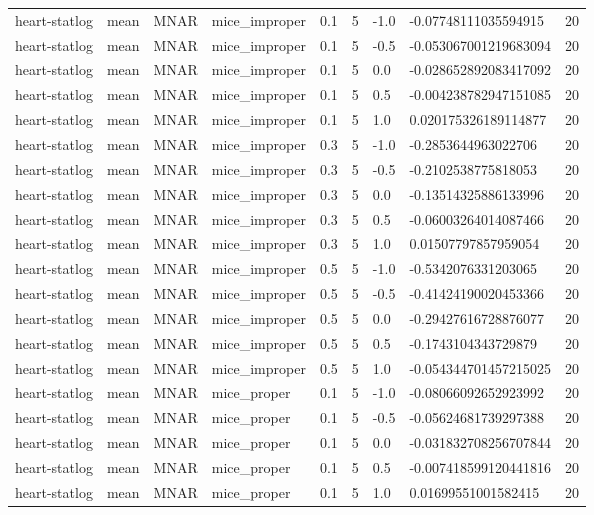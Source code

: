 \begin{tabular}{lllllllll}
heart-statlog & mean & MNAR & mice\_improper & 0.1 & 5 & -1.0 & -0.07748111035594915 & 20 \\
heart-statlog & mean & MNAR & mice\_improper & 0.1 & 5 & -0.5 & -0.053067001219683094 & 20 \\
heart-statlog & mean & MNAR & mice\_improper & 0.1 & 5 & 0.0 & -0.028652892083417092 & 20 \\
heart-statlog & mean & MNAR & mice\_improper & 0.1 & 5 & 0.5 & -0.004238782947151085 & 20 \\
heart-statlog & mean & MNAR & mice\_improper & 0.1 & 5 & 1.0 & 0.020175326189114877 & 20 \\
heart-statlog & mean & MNAR & mice\_improper & 0.3 & 5 & -1.0 & -0.2853644963022706 & 20 \\
heart-statlog & mean & MNAR & mice\_improper & 0.3 & 5 & -0.5 & -0.2102538775818053 & 20 \\
heart-statlog & mean & MNAR & mice\_improper & 0.3 & 5 & 0.0 & -0.13514325886133996 & 20 \\
heart-statlog & mean & MNAR & mice\_improper & 0.3 & 5 & 0.5 & -0.06003264014087466 & 20 \\
heart-statlog & mean & MNAR & mice\_improper & 0.3 & 5 & 1.0 & 0.01507797857959054 & 20 \\
heart-statlog & mean & MNAR & mice\_improper & 0.5 & 5 & -1.0 & -0.5342076331203065 & 20 \\
heart-statlog & mean & MNAR & mice\_improper & 0.5 & 5 & -0.5 & -0.41424190020453366 & 20 \\
heart-statlog & mean & MNAR & mice\_improper & 0.5 & 5 & 0.0 & -0.29427616728876077 & 20 \\
heart-statlog & mean & MNAR & mice\_improper & 0.5 & 5 & 0.5 & -0.1743104343729879 & 20 \\
heart-statlog & mean & MNAR & mice\_improper & 0.5 & 5 & 1.0 & -0.054344701457215025 & 20 \\
heart-statlog & mean & MNAR & mice\_proper & 0.1 & 5 & -1.0 & -0.08066092652923992 & 20 \\
heart-statlog & mean & MNAR & mice\_proper & 0.1 & 5 & -0.5 & -0.05624681739297388 & 20 \\
heart-statlog & mean & MNAR & mice\_proper & 0.1 & 5 & 0.0 & -0.031832708256707844 & 20 \\
heart-statlog & mean & MNAR & mice\_proper & 0.1 & 5 & 0.5 & -0.007418599120441816 & 20 \\
heart-statlog & mean & MNAR & mice\_proper & 0.1 & 5 & 1.0 & 0.01699551001582415 & 20 \\

\end{tabular}
